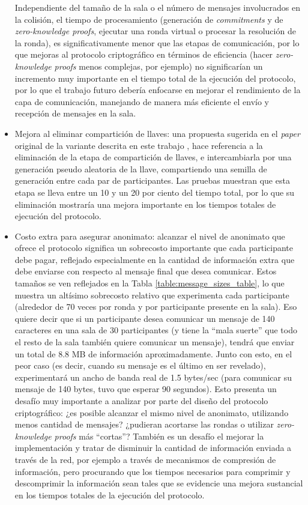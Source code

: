 \begin{itemize}
	Independiente del tamaño de la sala o el número de mensajes involucrados 
	en la colisión, el tiempo de procesamiento (generación de 
	\emph{commitments} y de \emph{zero-knowledge proofs}, ejecutar una ronda 
	virtual o procesar la resolución de la ronda), es significativamente menor 
	que las etapas de comunicación, por lo que mejoras al protocolo 
	criptográfico en términos de eficiencia (hacer \emph{zero-knowledge proofs} 
	menos complejas, por ejemplo) no significarían un incremento muy 
	importante en el tiempo total de la ejecución del protocolo, por lo que el 
	trabajo futuro debería enfocarse en mejorar el rendimiento de la capa de 
	comunicación, manejando de manera más eficiente el envío y recepción de 
	mensajes en la sala.
	\item Mejora al eliminar compartición de llaves: una propuesta sugerida en 
	el \emph{paper} original de la variante descrita en este trabajo 
	\cite{franck2014dining}, hace referencia a la eliminación de la etapa de 
	compartición de llaves, e intercambiarla por una generación pseudo 
	aleatoria de la llave, compartiendo una semilla de generación entre cada 
	par de participantes. Las pruebas muestran que esta etapa se lleva entre 
	un 10 y un 20 por ciento del tiempo total, por lo que su eliminación 
	mostraría una mejora importante en los tiempos totales de ejecución del 
	protocolo.
	\item Costo extra para asegurar anonimato: alcanzar el nivel de anonimato 
	que ofrece el protocolo significa un sobrecosto importante que cada 
	participante debe pagar, reflejado especialmente en la cantidad de 
	información extra que debe enviarse con respecto al mensaje final que 
	desea comunicar. Estos tamaños se ven reflejados en la Tabla 
	\ref{table:message_sizes_table}, lo que muestra un altísimo sobrecosto 
	relativo que experimenta cada participante (alrededor de 70 veces por 
	ronda y por participante presente en la sala). Eso quiere decir que si un 
	participante desea comunicar un mensaje de 140 caracteres en una sala de 
	30 participantes (y tiene la ``mala suerte'' que todo el resto de la sala 
	también quiere comunicar un mensaje), tendrá que enviar un total de 8.8 MB 
	de información aproximadamente. Junto con esto, en el peor caso (es decir, 
	cuando su mensaje es el último en ser revelado), experimentará un ancho de 
	banda real de 1.5 bytes/sec (para comunicar su mensaje de 140 bytes, tuvo 
	que esperar 90 segundos). Esto presenta un desafío muy importante a 
	analizar por parte del diseño del protocolo criptográfico: ¿es posible 
	alcanzar el mismo nivel de anonimato, utilizando menos cantidad de 
	mensajes? ¿pudieran acortarse las rondas o utilizar 
	\emph{zero-knowledge proofs} más ``cortas''? También es un desafío el 
	mejorar la implementación y tratar de disminuir la cantidad de información 
	enviada a través de la red, por ejemplo a través de mecanismos de 
	compresión de información, pero procurando que los tiempos necesarios para 
	comprimir y descomprimir la información sean tales que se evidencie una 
	mejora sustancial en los tiempos totales de la ejecución del protocolo.
\end{itemize}

